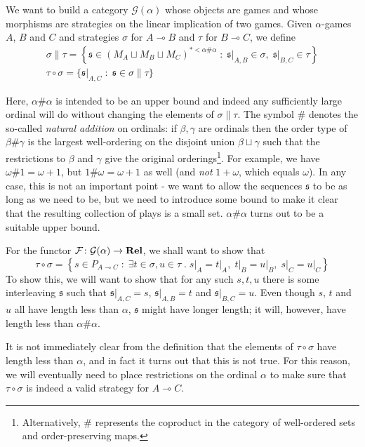 \documentclass[11pt]{article} %
\theoremstyle{plain} %
\theoremstyle{definition} %
\theoremstyle{note}
\theoremstyle{exercisestyle}
\newcommand{\catname}[1]{{\normalfont\textbf{#1}}}
\newcommand{\Rel}{\catname{Rel}}
\newcommand*\from{\colon}
\newcommand{\cmap}[3]{#1\from{}#2\to{}#3}
\renewcommand{\implies}{\multimap}
\newcommand{\comp}[2]{#1 \circ #2}
\newcommand{\cprd}{\sqcup}
\newcommand{\G}{\mathcal G}
\newcommand{\suchthat}{\;\colon\;}
\newcommand{\esuchthat}{\;.\;}
\newcommand{\F}{\mathcal F}
\newcommand{\s}{\mathfrak s}
\begin{document}
We want to build a category $\G(\alpha)$ whose objects are games and whose morphisms are strategies on the linear implication of two games.  Given $\alpha$-games $A$, $B$ and $C$ and strategies $\sigma$ for $A\implies B$ and $\tau$ for $B\implies C$, we define
\begin{gather*}
  \sigma\|\tau = \left\{\s\in (M_A\cprd M_B\cprd M_C)^{*<\alpha\#\alpha}\suchthat \s\vert_{A,B}\in\sigma,\;\s\vert_{B,C}\in\tau\right\}\\
  \comp\tau\sigma = \{\s\vert_{A,C}\suchthat \s\in\sigma\|\tau\}
\end{gather*}

Here, $\alpha\#\alpha$ is intended to be an upper bound and indeed any sufficiently large ordinal will do without changing the elements of $\sigma\|\tau$.  The symbol $\#$ denotes the so-called \emph{natural addition} on ordinals: if $\beta,\gamma$ are ordinals then the order type of $\beta\#\gamma$ is the largest well-ordering on the disjoint union $\beta\sqcup\gamma$ such that the restrictions to $\beta$ and $\gamma$ give the original orderings\footnote{Alternatively, $\#$ represents the coproduct in the category of well-ordered sets and order-preserving maps.}.  For example, we have $\omega\#1=\omega+1$, but $1\#\omega=\omega+1$ as well (and \emph{not} $1+\omega$, which equals $\omega$).  In any case, this is not an important point - we want to allow the sequences $\s$ to be as long as we need to be, but we need to introduce some bound to make it clear that the resulting collection of plays is a small set.  $\alpha\#\alpha$ turns out to be a suitable upper bound.

For the functor $\cmap{\F}{\G(\alpha)}{\Rel}$, we shall want to show that
\[
  \comp\tau\sigma = \left\{s\in P_{A\implies C}\suchthat\exists t\in\sigma,u\in\tau\esuchthat s\vert_A=t\vert_A,\;t\vert_B=u\vert_B,\;s\vert_C=u\vert_C\right\}
  \]
To show this, we will want to show that for any such $s,t,u$ there is some interleaving $\s$ such that $\s\vert_{A,C}=s$, $\s\vert_{A,B}=t$ and $\s\vert_{B,C}=u$.  Even though $s$, $t$ and $u$ all have length less than $\alpha$, $\s$ might have longer length; it will, however, have length less than $\alpha\#\alpha$.

It is not immediately clear from the definition that the elements of $\comp\tau\sigma$ have length less than $\alpha$, and in fact it turns out that this is not true.  For this reason, we will eventually need to place restrictions on the ordinal $\alpha$ to make sure that $\comp\tau\sigma$ is indeed a valid strategy for $A\implies C$.  
\end{document}
